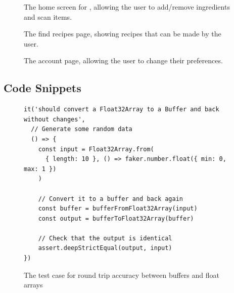 \begin{figure}[ht]
  \centering
  
  \caption{\label{fig:proto_home}The home screen for \chef{}, allowing the user to add/remove ingredients and scan items.}
\end{figure}

\begin{figure}[ht]
  \centering
  
  \caption{\label{fig:proto_find_recipes}The find recipes page, showing recipes that can be made by the user. }
\end{figure}

\begin{figure}[ht]
  \centering
  
  \caption{\label{fig:proto_account}The account page, allowing the user to change their preferences.}
\end{figure}

\clearpage\subsection{Code Snippets}

\begin{figure}[h]
  \centering
  \caption{\label{fig:buffer_float_array}The test case for round trip accuracy between buffers and float arrays}
  \begin{verbatim}
it('should convert a Float32Array to a Buffer and back without changes',
  // Generate some random data
  () => {
    const input = Float32Array.from(
      { length: 10 }, () => faker.number.float({ min: 0, max: 1 })
    )

    // Convert it to a buffer and back again
    const buffer = bufferFromFloat32Array(input)
    const output = bufferToFloat32Array(buffer)

    // Check that the output is identical
    assert.deepStrictEqual(output, input)
})
  \end{verbatim}
\end{figure}

